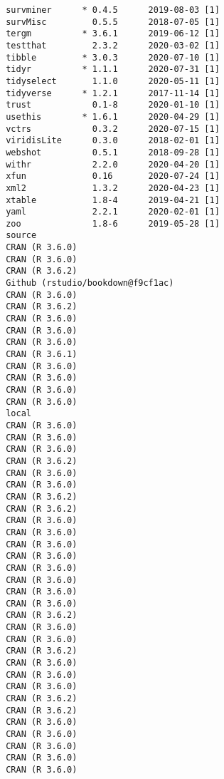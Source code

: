 \documentclass [11pt, proquest] {uwthesis}[2015/03/03]
\begin{document}
\begin{verbatim}
 survminer      * 0.4.5      2019-08-03 [1]
 survMisc         0.5.5      2018-07-05 [1]
 tergm          * 3.6.1      2019-06-12 [1]
 testthat         2.3.2      2020-03-02 [1]
 tibble         * 3.0.3      2020-07-10 [1]
 tidyr          * 1.1.1      2020-07-31 [1]
 tidyselect       1.1.0      2020-05-11 [1]
 tidyverse      * 1.2.1      2017-11-14 [1]
 trust            0.1-8      2020-01-10 [1]
 usethis        * 1.6.1      2020-04-29 [1]
 vctrs            0.3.2      2020-07-15 [1]
 viridisLite      0.3.0      2018-02-01 [1]
 webshot          0.5.1      2018-09-28 [1]
 withr            2.2.0      2020-04-20 [1]
 xfun             0.16       2020-07-24 [1]
 xml2             1.3.2      2020-04-23 [1]
 xtable           1.8-4      2019-04-21 [1]
 yaml             2.2.1      2020-02-01 [1]
 zoo              1.8-6      2019-05-28 [1]
 source                               
 CRAN (R 3.6.0)                       
 CRAN (R 3.6.0)                       
 CRAN (R 3.6.2)                       
 Github (rstudio/bookdown@f9cf1ac)    
 CRAN (R 3.6.0)                       
 CRAN (R 3.6.2)                       
 CRAN (R 3.6.0)                       
 CRAN (R 3.6.0)                       
 CRAN (R 3.6.0)                       
 CRAN (R 3.6.1)                       
 CRAN (R 3.6.0)                       
 CRAN (R 3.6.0)                       
 CRAN (R 3.6.0)                       
 CRAN (R 3.6.0)                       
 local                                
 CRAN (R 3.6.0)                       
 CRAN (R 3.6.0)                       
 CRAN (R 3.6.0)                       
 CRAN (R 3.6.2)                       
 CRAN (R 3.6.0)                       
 CRAN (R 3.6.0)                       
 CRAN (R 3.6.2)                       
 CRAN (R 3.6.2)                       
 CRAN (R 3.6.0)                       
 CRAN (R 3.6.0)                       
 CRAN (R 3.6.0)                       
 CRAN (R 3.6.0)                       
 CRAN (R 3.6.0)                       
 CRAN (R 3.6.0)                       
 CRAN (R 3.6.0)                       
 CRAN (R 3.6.0)                       
 CRAN (R 3.6.2)                       
 CRAN (R 3.6.0)                       
 CRAN (R 3.6.0)                       
 CRAN (R 3.6.2)                       
 CRAN (R 3.6.0)                       
 CRAN (R 3.6.0)                       
 CRAN (R 3.6.0)                       
 CRAN (R 3.6.2)                       
 CRAN (R 3.6.2)                       
 CRAN (R 3.6.0)                       
 CRAN (R 3.6.0)                       
 CRAN (R 3.6.0)                       
 CRAN (R 3.6.0)                       
 CRAN (R 3.6.0)                       

\end{verbatim}
\end{document}
